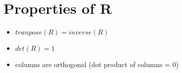 \section{Properties of R}
\begin{itemize}
\item $tranpose(R) = inverse(R)$
\item $det(R) = 1$
\item columns are orthogonal (dot product of columns = 0)
\end{itemize}